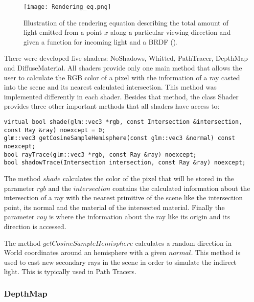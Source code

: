 \begin{figure}[H]
	\centering
	\caption{Illustration of the rendering equation describing the total amount of light emitted from a point
	$x$
	along a particular viewing direction and given a function for incoming light and a BRDF (\cite{RenderingEquation}).}
	\label{Rendering_Equation.}
	\texttt{[image: Rendering\_eq.png]}
\end{figure}

\par
There were developed five shaders: NoShadows, Whitted, PathTracer, DepthMap and DiffuseMaterial.
All shaders provide only one main method that allows the user to calculate the RGB color of a pixel with the information of a ray casted into the scene and its nearest calculated intersection.
This method was implemented differently in each shader.
Besides that method, the class Shader provides three other important methods that all shaders have access to:

\begin{lstlisting}[caption={Main methods of Shader}, captionpos=b, label=Shader]
virtual bool shade(glm::vec3 *rgb, const Intersection &intersection, const Ray &ray) noexcept = 0;
glm::vec3 getCosineSampleHemisphere(const glm::vec3 &normal) const noexcept;
bool rayTrace(glm::vec3 *rgb, const Ray &ray) noexcept;
bool shadowTrace(Intersection intersection, const Ray &ray) noexcept;
\end{lstlisting}

\par
The method
$shade$
calculates the color of the pixel that will be stored in the parameter
$rgb$
and the
$intersection$
contains the calculated information about the intersection of a ray with the nearest primitive of the scene like the intersection point, its normal and the material of the intersected material.
Finally the parameter
$ray$
is where the information about the ray like its origin and its direction is accessed.

\par
The method
$getCosineSampleHemisphere$
calculates a random direction in World coordinates around an hemisphere with a given
$normal$.
This method is used to cast new secondary rays in the scene in order to simulate the indirect light.
This is typically used in Path Tracers.

\subsubsection{DepthMap}


